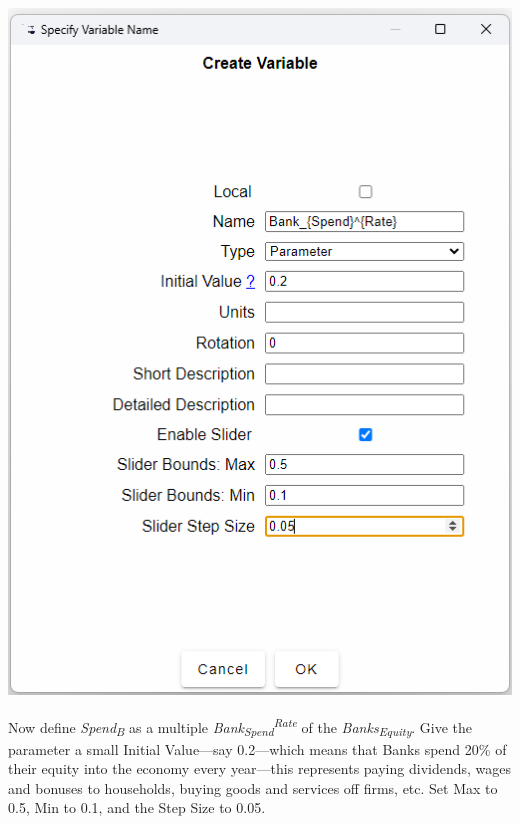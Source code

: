 \noindent\includegraphics[width=\textwidth]{images/MonetaryModel01GodleyTable05DefineFlows04}

Now define \emph{Spend}\textsubscript{\emph{B}} as a multiple \emph{Bank}\textsubscript{\emph{Spend}}\emph{}\textsuperscript{\emph{Rate}}
of the \emph{Banks}\textsubscript{\emph{Equity}}. Give the parameter
a small Initial Value---say 0.2---which means that Banks spend 20\%
of their equity into the economy every year---this represents paying
dividends, wages and bonuses to households, buying goods and services
off firms, etc. Set Max to 0.5, Min to 0.1, and the Step Size to 0.05.

